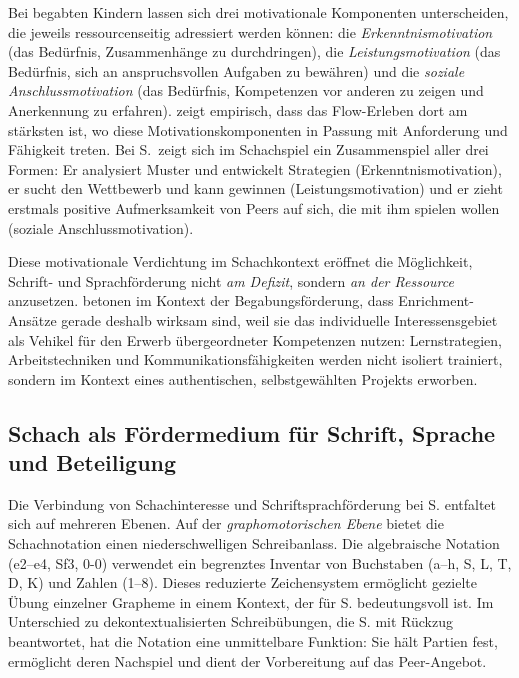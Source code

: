 \documentclass[ngerman, a4paper]{article}
\begin{document}
Bei begabten Kindern lassen sich drei motivationale Komponenten
unterscheiden, die jeweils ressourcenseitig adressiert werden können:
die \textit{Erkenntnismotivation} (das Bedürfnis, Zusammenhänge zu
durchdringen), die \textit{Leistungsmotivation} (das Bedürfnis, sich an
anspruchsvollen Aufgaben zu bewähren) und die \textit{soziale
Anschlussmotivation} (das Bedürfnis, Kompetenzen vor anderen zu zeigen und
Anerkennung zu erfahren). \textcite[S.\,84--89]{lehwald2017motivation}
zeigt empirisch, dass das Flow-Erleben dort am stärksten ist, wo diese
Motivationskomponenten in Passung mit Anforderung und Fähigkeit treten.
Bei S.\ zeigt sich im Schachspiel ein Zusammenspiel aller drei Formen:
Er analysiert Muster und entwickelt Strategien (Erkenntnismotivation),
er sucht den Wettbewerb und kann gewinnen (Leistungsmotivation) und er
zieht erstmals positive Aufmerksamkeit von Peers auf sich, die mit ihm
spielen wollen (soziale Anschlussmotivation).

Diese motivationale Verdichtung im Schachkontext eröffnet die Möglichkeit, Schrift-
und Sprachförderung nicht \textit{am Defizit}, sondern \textit{an der Ressource} anzusetzen.
\textcite[S.\,254--273]{fischer2020begabungsfoerderung} betonen im Kontext der Begabungsförderung, dass Enrichment-Ansätze
gerade deshalb wirksam sind, weil sie das individuelle Interessensgebiet als Vehikel
für den Erwerb übergeordneter Kompetenzen nutzen: Lernstrategien, Arbeitstechniken
und Kommunikationsfähigkeiten werden nicht isoliert trainiert, sondern im Kontext
eines authentischen, selbstgewählten Projekts erworben.

\subsection{Schach als Fördermedium für Schrift, Sprache und Beteiligung}

Die Verbindung von Schachinteresse und Schriftsprachförderung bei S. entfaltet sich
auf mehreren Ebenen. Auf der \textit{graphomotorischen Ebene} bietet die Schachnotation
einen niederschwelligen Schreibanlass. Die algebraische Notation (e2--e4, Sf3, 0-0)
verwendet ein begrenztes Inventar von Buchstaben (a--h, S, L, T, D, K) und Zahlen
(1--8). Dieses reduzierte Zeichensystem ermöglicht gezielte Übung einzelner Grapheme
in einem Kontext, der für S. bedeutungsvoll ist. Im Unterschied zu dekontextualisierten
Schreibübungen, die S. mit Rückzug beantwortet, hat die Notation eine unmittelbare
Funktion: Sie hält Partien fest, ermöglicht deren Nachspiel und dient der Vorbereitung
auf das Peer-Angebot.
\end{document}
